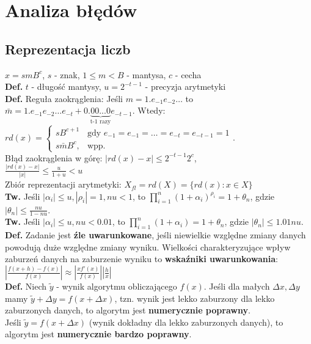 \documentclass[a4paper,twocolumn]{article}
\begin{document}
\fontsize{7}{4}\selectfont


\section{Analiza błędów}
\subsection{Reprezentacja liczb}
$x = smB^c$, $s$ - znak, $1 \leq m < B$ - mantysa, $c$ - cecha \\
\textbf{Def.} $t$ - długość mantysy, $u = 2^{-t-1}$ - precyzja arytmetyki \\
\textbf{Def.} Reguła zaokrąglenia: Jeśli $m = 1.e_{-1}e_{-2}\dots$ to \\
$\bar{m} = 1.e_{-1}e_{-2}\dots e_{-t} + 0.\underbrace{00...0}_{\text{t-1 razy}}e_{-t-1}$. Wtedy:\\
$rd(x) = 
\begin{cases}
   sB^{c+1}& \text{gdy } e_{-1} = e_{-1} = \dots = e_{-t} = e_{-t-1} = 1\\
   s\bar{m}B^c,       & \text{wpp.} 
\end{cases}.$\\
Błąd zaokrąglenia w górę:
$|rd(x) - x| \leq 2^{-t-1} 2^c$, \\
$\frac{|rd(x) - x|}{|x|} \leq  \frac{u}{1+u} < u$ \\
Zbiór reprezentacji arytmetyki: $X_{fl} = rd(X) = \{rd(x) : x \in X \}$ \\
\textbf{Tw.} Jeśli $|\alpha_i| \leq u, |\rho_i| = 1, nu < 1$, to $\prod_{i = 1}^{n} (1 + \alpha_i)^{\rho_i} = 1 + \theta_n$, gdzie $|\theta_n| \leq \frac{nu}{1 - nu}$. \\
\textbf{Tw.} Jeśli $|\alpha_i| \leq u, nu < 0.01$, to $\prod_{i = 1}^{n} (1 + \alpha_i) = 1 + \theta_n$, gdzie $|\theta_n| \leq 1.01nu$. \\
\textbf{Def.} Zadanie jest \textbf{źle uwarunkowane}, jeśli niewielkie względne zmiany danych powodują duże względne zmiany wyniku. Wielkości charakteryzujące wpływ zaburzeń danych na zaburzenie wyniku to
\textbf{wskaźniki uwarunkowania}:\\
$|\frac{f(x+h)-f(x)}{f(x)}| \approx |\frac{xf'(x)}{f(x)}||\frac{h}{x}|$\\
\textbf{Def.} Niech $\tilde{y}$ - wynik algorytmu obliczającego $f(x)$. Jeśli dla małych $\Delta x, \Delta y$ mamy $\tilde{y} + \Delta y = f(x + \Delta x)$, tzn. wynik jest lekko zaburzony dla lekko zaburzonych danych, to algorytm jest \textbf{numerycznie poprawny}. \\
Jeśli $\tilde{y} = f(x + \Delta x)$ (wynik dokładny dla lekko zaburzonych danych), to algorytm jest \textbf{numerycznie bardzo poprawny}.\\
\end{document}
